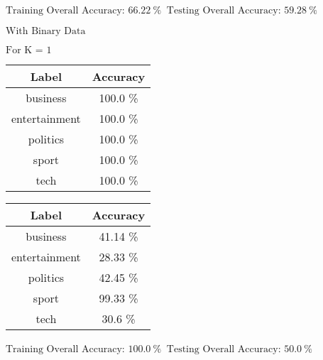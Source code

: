 \documentclass[8pt]{extarticle}
\begin{document}
    \begin{center}
        $\displaystyle \text{Training Overall Accuracy:\ }66.22\ \%$
        $\displaystyle \ \text{Testing Overall Accuracy:\ }59.28\ \%$
    \end{center}

    \begin{center}
        $\displaystyle \text{With }\text{Binary}\text{ Data}$
    \end{center}

    $\displaystyle \text{For K = }1$
    \begin{center}
        \quad
    \end{center}
    \begin{center}
        \begin{tabular}{cc}
            \hline
            Label & Accuracy\\
            \hline
            business &   100.0 \% \\
       entertainment &   100.0 \% \\
           politics  &   100.0 \% \\
              sport  &   100.0 \% \\
               tech  &   100.0 \%
         \end{tabular}
         \quad
        \begin{tabular}{cc}
            \hline
            Label & Accuracy\\
            \hline
            business &   41.14 \% \\
        entertainment &  28.33 \% \\
           politics  &   42.45 \% \\
              sport  &   99.33  \% \\
               tech  &   30.6 \%
        \end{tabular}
    \end{center}
    \begin{center}
        $\displaystyle \text{Training Overall Accuracy:\ }100.0\ \%$
        $\displaystyle \ \text{Testing Overall Accuracy:\ }50.0\ \%$
    \end{center}
\end{document}
